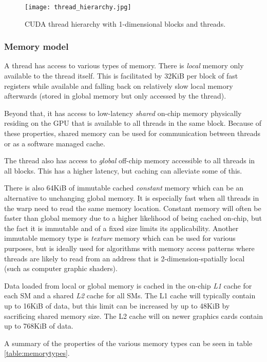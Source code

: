 \begin{figure}[h!]\centering
\texttt{[image: thread\_hierarchy.jpg]}
\caption{CUDA thread hierarchy with 1-dimensional blocks and threads.\label{thread_hierarchy}}
\end{figure}


\subsubsection{Memory model}
A thread has access to various types of memory.
There is \emph{local} memory only available to the thread itself.
This is facilitated by 32KiB per block of fast registers while available and falling back on relatively slow local memory afterwards (stored in global memory but only accessed by the thread).

Beyond that, it has access to low-latency \emph{shared} on-chip memory physically residing on the GPU that is available to all threads in the same block. 
Because of these properties, shared memory can be used for communication between threads or as a software managed cache.

The thread also has access to \emph{global} off-chip memory accessible to all threads in all blocks.
This has a higher latency, but caching can alleviate some of this.

There is also 64KiB of immutable cached \emph{constant} memory which can be an alternative to unchanging global memory.
It is especially fast when all threads in the warp need to read the same memory location.
Constant memory will often be faster than global memory due to a higher likelihood of being cached on-chip, but the fact it is immutable and of a fixed size limits its applicability.
Another immutable memory type is \emph{texture} memory which can be used for various purposes, but is ideally used for algorithms with memory access patterns where threads are likely to read from an address that is 2-dimension-spatially local (such as computer graphic shaders).

Data loaded from local or global memory is cached in the on-chip \emph{L1} cache for each SM and a shared \emph{L2} cache for all SMs.
The L1 cache will typically contain up to 16KiB of data, but this limit can be increased by up to 48KiB by sacrificing shared memory size.
The L2 cache will on newer graphics cards contain up to 768KiB of data.

A summary of the properties of the various memory types can be seen in table \ref{table:memorytypes}.

